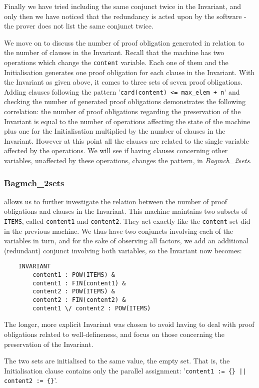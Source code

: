 \documentclass[11pt,journal]{IEEEtran}
\begin{document}
	Finally we have tried including the same conjunct twice in the Invariant, and only then we have noticed that the redundancy is acted upon by the software - the prover does not list the same conjunct twice. 
	
	We move on to discuss the number of proof obligation generated in relation to the number of clauses in the Invariant. Recall that the machine has two operations which change the \texttt{content} variable. Each one of them and the Initialisation generates one proof obligation for each clause in the Invariant. With the Invariant as given above, it comes to three sets of seven proof obligations. Adding clauses following the pattern '\texttt{card(content) <= max\_elem + n}' and checking the number of generated proof obligations demonstrates the following correlation: the number of proof obligations regarding the preservation of the Invariant is equal to the number of operations affecting the state of the machine plus one for the Initialisation multiplied by the number of clauses in the Invariant. However at this point all the clauses are related to the single variable affected by the operations. We will see if having clauses concerning other variables, unaffected by these operations, changes the pattern, in \emph{Bagmch\_2sets}.
	
	\subsubsection{Bagmch\_2sets} allows us to further investigate the relation between the number of proof obligations and clauses in the Invariant. This machine maintains two subsets of \texttt{ITEMS}, called \texttt{content1} and \texttt{content2}. They act exactly like the \texttt{content} set did in the previous machine. We thus have two conjuncts involving each of the variables in turn, and for the sake of observing all factors, we add an additional (redundant) conjunct involving both variables, so the Invariant now becomes:
	
	\begin{lstlisting}
	INVARIANT
		content1 : POW(ITEMS) &
		content1 : FIN(content1) &
		content2 : POW(ITEMS) &
		content2 : FIN(content2) &
		content1 \/ content2 : POW(ITEMS)
	\end{lstlisting}
	The longer, more explicit Invariant was chosen to avoid having to deal with proof obligations related to well-defineness, and focus on those concerning the preservation of the Invariant.
	
	The two sets are initialised to the same value, the empty set. That is, the Initialisation clause contains only the parallel assignment: '\texttt{content1 := \{\} || content2 := \{\}}'.
	
\end{document}
